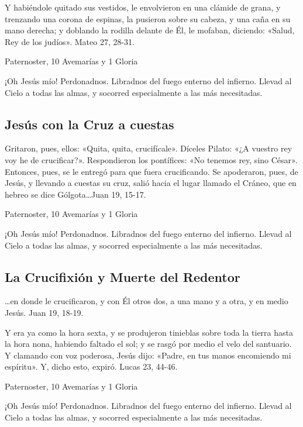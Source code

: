 \documentclass[a4paper,11pt, oneside]{report}
\let\footnote=\endnote
\begin{document}
        Y habiéndole quitado sus vestidos, le envolvieron en una clámide de grana, y trenzando una corona de espinas, la pusieron sobre su cabeza, y una
        caña en su mano derecha; y doblando la rodilla delante de Él, le mofaban, diciendo: «Salud, Rey de los judíos». Mateo 27, 28-31.
        
         Paternoster, 10 Avemarías y 1 Gloria
        
        \medskip
        ¡Oh Jesús mío! Perdonadnos. Libradnos del fuego enterno del infierno. Llevad al Cielo a todas las almas, y socorred especialmente a las más necesitadas.
    
      \subsection*{Jesús con la Cruz a cuestas}
        Gritaron, pues, ellos: «Quita, quita, crucifícale». Díceles Pilato: «¿A vuestro rey voy he de crucificar?». Respondieron los pontífices: «No tenemos rey,
        sino César». Entonces, pues, se le entregó para que fuera crucificando. Se apoderaron, pues, de Jesús, y llevando a cuestas su cruz, salió hacia el lugar
        llamado el Cráneo, que en hebreo se dice Gólgota\ldots Juan 19, 15-17.

        \medskip
         Paternoster, 10 Avemarías y 1 Gloria
        
        \medskip
        ¡Oh Jesús mío! Perdonadnos. Libradnos del fuego enterno del infierno. Llevad al Cielo a todas las almas, y socorred especialmente a las más necesitadas.
      
      \subsection*{La Crucifixión y Muerte del Redentor}
        {\ldots}en donde le crucificaron, y con Él otros dos, a una mano y a otra, y en medio Jesús. Juan 19, 18-19.

        \medskip
        Y era ya como la hora sexta, y se produjeron tinieblas sobre toda la tierra hasta la hora nona, habiendo faltado el sol; y se rasgó por medio 
        el velo del santuario. Y clamando con voz poderosa, Jesús dijo: «Padre, en tus manos encomiendo mi espíritu\footnote{Sal. 30, 6}». 
        Y, dicho esto, expiró. Lucas 23, 44-46.
        
         Paternoster, 10 Avemarías y 1 Gloria
        
        \medskip
        ¡Oh Jesús mío! Perdonadnos. Libradnos del fuego enterno del infierno. Llevad al Cielo a todas las almas, y socorred especialmente a las más necesitadas.
        
\end{document}
